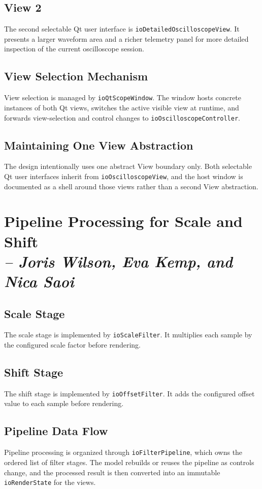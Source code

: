 \subsection{View 2}
The second selectable Qt user interface is \texttt{ioDetailedOscilloscopeView}. It presents a larger waveform area and a richer telemetry panel for more detailed inspection of the current oscilloscope session.

\subsection{View Selection Mechanism}
View selection is managed by \texttt{ioQtScopeWindow}. The window hosts concrete instances of both Qt views, switches the active visible view at runtime, and forwards view-selection and control changes to \texttt{ioOscilloscopeController}.

\subsection{Maintaining One View Abstraction}
The design intentionally uses one abstract View boundary only. Both selectable Qt user interfaces inherit from \texttt{ioOscilloscopeView}, and the host window is documented as a shell around those views rather than a second View abstraction.

\section{Pipeline Processing for Scale and Shift \\
\small{\textit{-- Joris Wilson, Eva Kemp, and Nica Saoi}}}
\label{Section::Pipeline Processing for Scale and Shift}

\subsection{Scale Stage}
The scale stage is implemented by \texttt{ioScaleFilter}. It multiplies each sample by the configured scale factor before rendering.

\subsection{Shift Stage}
The shift stage is implemented by \texttt{ioOffsetFilter}. It adds the configured offset value to each sample before rendering.

\subsection{Pipeline Data Flow}
Pipeline processing is organized through \texttt{ioFilterPipeline}, which owns the ordered list of filter stages. The model rebuilds or reuses the pipeline as controls change, and the processed result is then converted into an immutable \texttt{ioRenderState} for the views.

